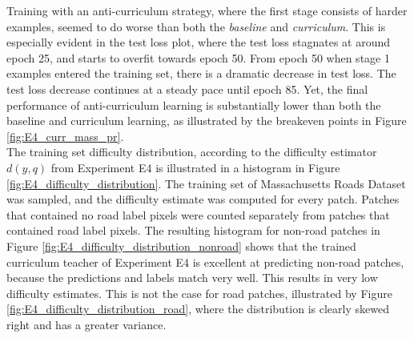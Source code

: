 Training with an anti-curriculum strategy, where the first stage consists of harder examples, seemed to do worse than both the \textit{baseline} and \textit{curriculum}. This is especially evident in the test loss plot, where the test loss stagnates at around epoch 25, and starts to overfit towards epoch 50. From epoch 50 when stage 1 examples entered the training set, there is a dramatic decrease in test loss. The test loss decrease continues at a steady pace until epoch 85. Yet, the final performance of anti-curriculum learning is substantially lower than both the baseline and curriculum learning, as illustrated by the breakeven points in Figure \ref{fig:E4_curr_mass_pr}.\\

The training set difficulty distribution, according to the difficulty estimator $d(y,q)$ from Experiment E4 is illustrated in a histogram in Figure \ref{fig:E4_difficulty_distribution}. The training set of  Massachusetts Roads Dataset was sampled, and the difficulty estimate was computed for every patch. Patches that contained no road label pixels were counted separately from patches that contained road label pixels. The resulting histogram for non-road patches in Figure \ref{fig:E4_difficulty_distribution_nonroad} shows that the trained curriculum teacher of Experiment E4 is excellent at predicting non-road patches, because the predictions and labels match very well. This results in very low difficulty estimates. This is not the case for road patches, illustrated by Figure  \ref{fig:E4_difficulty_distribution_road}, where the distribution is clearly skewed right and has a greater variance. \\

